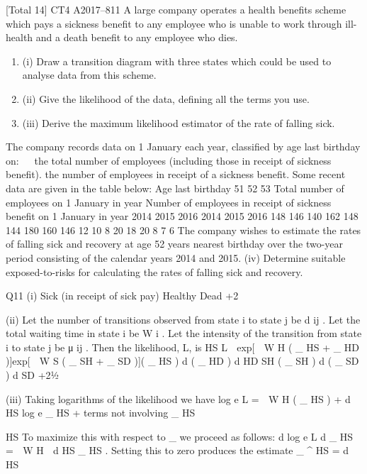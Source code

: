 \documentclass[a4paper,12pt]{article}
\begin{document}
[Total 14]
CT4 A2017–811
A large company operates a health benefits scheme which pays a sickness benefit to
any employee who is unable to work through ill-health and a death benefit to any
employee who dies.
\begin{enumerate}
\item (i) Draw a transition diagram with three states which could be used to analyse
data from this scheme.
\item 
(ii) Give the likelihood of the data, defining all the terms you use. 
\item (iii) Derive the maximum likelihood estimator of the rate of falling sick. 
\end{enumerate}
The company records data on 1 January each year, classified by age last birthday on:


the total number of employees (including those in receipt of sickness benefit).
the number of employees in receipt of a sickness benefit.
Some recent data are given in the table below:
Age last
birthday
51
52
53
Total number of employees
on 1 January in year
Number of employees in receipt of
sickness benefit on 1 January in year
2014 2015 2016 2014 2015 2016
148
146
140 162
148
144 180
160
146 12
10
8 20
18
20 8
7
6
The company wishes to estimate the rates of falling sick and recovery at age 52 years
nearest birthday over the two-year period consisting of the calendar years 2014 and
2015.
(iv)
Determine suitable exposed-to-risks for calculating the rates of falling sick and
recovery.

\newpage
Q11
(i)
Sick (in receipt of
sick pay)
Healthy
Dead
+2

(ii)
Let the number of transitions observed from state i to state j be d ij . 
Let the total waiting time in state i be W i . 
Let the intensity of the transition from state i to state j be μ ij . 
Then the likelihood, L, is
HS
L  exp[  W H ( \mu_ HS + \mu_ HD )]exp[  W S ( \mu_ SH + \mu_ SD )]( \mu_ HS ) d ( \mu_ HD ) d
HD
SH
( \mu_ SH ) d ( \mu_ SD ) d
SD
+21⁄2

(iii)
Taking logarithms of the likelihood we have
log e L \;=\;  W H ( \mu_ HS ) + d HS log e \mu_ HS + terms not involving \mu_ HS

HS
To maximize this with respect to \mu_ we proceed as follows:
d log e L
d \mu_ HS
\;=\;  W
H

d HS
\mu_ HS
.
Setting this to zero produces the estimate
\mu_
^
HS
\;=\;
d HS
\end{document}
